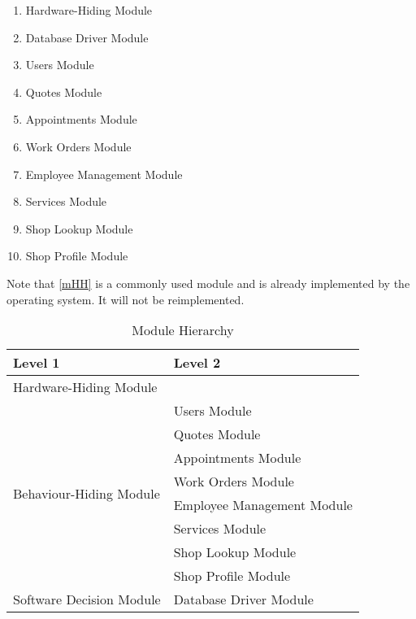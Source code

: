 \documentclass[12pt, titlepage]{article}
\begin{document}
\begin{enumerate}[label=\textbf{M\arabic*:},ref=M\arabic*]
	\item \label{mHH} Hardware-Hiding Module
	\item \label{mDBDriver} Database Driver Module
	\item \label{mUsers} Users Module
	\item \label{mQuotes} Quotes Module
	\item \label{mAppointments} Appointments Module
	\item \label{mWorkOrders} Work Orders Module
	\item \label{mEmployeeManagement} Employee Management Module
	\item \label{mServices} Services Module
	\item \label{mShopLookup} Shop Lookup Module
	\item \label{mShopProfile} Shop Profile Module
\end{enumerate}

Note that \ref{mHH} is a commonly used module and is already implemented by the operating system.
It will not be reimplemented.

\begin{table}[H]
	\centering
	\begin{tabular}{p{} p{}}
		\toprule
		\textbf{Level 1}                                      & \textbf{Level 2}           \\
		\midrule

		Hardware-Hiding Module                                & ~                          \\

		\midrule

		\multirow{8}{0.3\textwidth}{Behaviour-Hiding Module}  & Users Module               \\
		                                                      & Quotes Module              \\
		                                                      & Appointments Module        \\
		                                                      & Work Orders Module         \\
		                                                      & Employee Management Module \\
		                                                      & Services Module            \\
		                                                      & Shop Lookup Module         \\
		                                                      & Shop Profile Module        \\
		\midrule

		\multirow{1}{0.3\textwidth}{Software Decision Module} & Database Driver Module     \\

		\bottomrule
	\end{tabular}
	\caption{Module Hierarchy}
	\label{TblMH}
\end{table}
\end{document}
